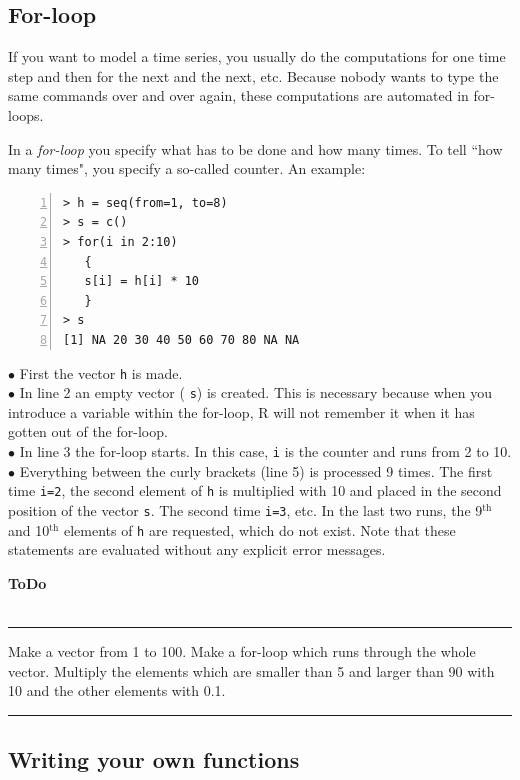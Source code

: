 \documentclass[a4paper,11pt,twocolumn,tablecaptionabove]{scrartcl}
\newenvironment{ToDo} {%
  \begin{flushright}
    \hfill
    \begin{minipage}{0.95\columnwidth}         %
    \textsf{\textbf{ToDo}} \\
      \vspace{-0.85cm}\\
      {\color{Gray}\rule[-0.1cm]{\columnwidth}{1.5pt}}} { %
      {\color{Gray} \rule[0.3cm]{\columnwidth}{1.5pt}}
    \end{minipage}
    \vspace{1em}
  \end{flushright}
  }
\begin{document}
\subsection{For-loop}

If you want to model a time series, you usually do the computations for one time step and then for the next and the next, etc. Because nobody wants to type the same commands over and over again, these computations are automated in for-loops. 

In a \emph{for-loop} you specify what has to be done and how many times. To tell ``how many times", you specify a so-called counter. An example:

\begin{Verbatim}[frame=single,numbers=left,gobble=0, xleftmargin=0.35cm, numbersep=0.1cm]
> h = seq(from=1, to=8)
> s = c()
> for(i in 2:10) 
   {
   s[i] = h[i] * 10
   }
> s
[1] NA 20 30 40 50 60 70 80 NA NA
\end{Verbatim}

\noindent $\bullet$ First the vector  \texttt{h} is made.\\
\noindent $\bullet$ In line 2 an empty vector ( \texttt{s}) is created. This is necessary because when you introduce a variable within the for-loop, R will not remember it when it has gotten out of the for-loop.\\
\noindent $\bullet$  In line 3 the for-loop starts. In this case, \texttt{i} is the counter and runs from 2 to 10.\\
\noindent $\bullet$ Everything between the curly brackets (line 5) is processed 9 times. The first time \texttt{i=2}, the second element of \texttt{h} is multiplied with 10 and placed in the second position of the vector \texttt{s}. The second time \texttt{i=3}, etc. In the last two runs, the 9$^\mathrm{th}$ and 10$^\mathrm{th}$ elements of \texttt{h} are requested, which do not exist. Note that these statements are evaluated without any explicit error messages.

\begin{ToDo}
Make a vector from 1 to 100. Make a for-loop which runs through the whole vector. Multiply the elements which are smaller than 5 and larger than 90 with 10 and the other elements with 0.1.
\end{ToDo}

\subsection{Writing your own functions}
\label{sec:progfunc}
\end{document}
